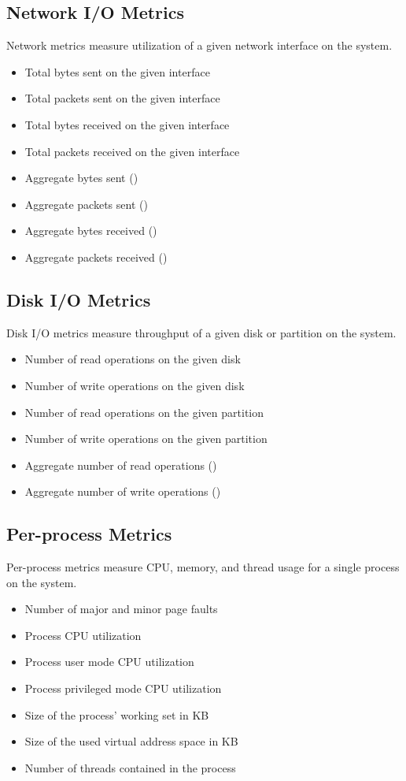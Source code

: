 \subsection{Network I/O Metrics}
Network metrics measure utilization of a given network interface on the system.
\begin{itemize}
\item Total bytes sent on the given interface
\item Total packets sent on the given interface
\item Total bytes received on the given interface
\item Total packets received on the given interface
\item Aggregate bytes sent (\dcamp)
\item Aggregate packets sent (\dcamp)
\item Aggregate bytes received (\dcamp)
\item Aggregate packets received (\dcamp)
\end{itemize}

\subsection{Disk I/O Metrics}
Disk I/O metrics measure throughput of a given disk or partition on the system.
\begin{itemize}
\item Number of read operations on the given disk
\item Number of write operations on the given disk
\item Number of read operations on the given partition
\item Number of write operations on the given partition
\item Aggregate number of read operations (\dcamp)
\item Aggregate number of write operations (\dcamp)
\end{itemize}

\subsection{Per-process Metrics}
Per-process metrics measure CPU, memory, and thread usage for a single process on the system.
\begin{itemize}
\item Number of major and minor page faults
\item Process CPU utilization
\item Process user mode CPU utilization
\item Process privileged mode CPU utilization
\item Size of the process' working set in KB
\item Size of the used virtual address space in KB
\item Number of threads contained in the process
\end{itemize}

